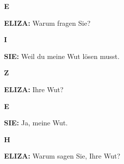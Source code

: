 \documentclass{article}
\begin{document}
\begin{minipage}[t]{0.13\textwidth}
  \centering
  {\bfseries\fontsize{14.4}{14.4}\selectfont\textcolor{pastelpink}{E}}
\end{minipage}%
\begin{minipage}[t]{0.81\textwidth}
  \textbf{ELIZA:} Warum fragen Sie?
\end{minipage}

\vspace{0.5cm}

\begin{minipage}[t]{0.13\textwidth}
  \centering
  {\bfseries\fontsize{14.4}{14.4}\selectfont\textcolor{pastelpink}{I}}
\end{minipage}%
\begin{minipage}[t]{0.81\textwidth}
  \textbf{SIE:} Weil du meine Wut lösen musst.
\end{minipage}

\vspace{0.5cm}

\begin{minipage}[t]{0.13\textwidth}
  \centering
  {\bfseries\fontsize{14.4}{14.4}\selectfont\textcolor{pastelpink}{Z}}
\end{minipage}%
\begin{minipage}[t]{0.81\textwidth}
  \textbf{ELIZA:} Ihre Wut?
\end{minipage}

\vspace{0.5cm}

\begin{minipage}[t]{0.13\textwidth}
  \centering
  {\bfseries\fontsize{14.4}{14.4}\selectfont\textcolor{pastelpink}{E}}
\end{minipage}%
\begin{minipage}[t]{0.81\textwidth}
  \textbf{SIE:} Ja, meine Wut.
\end{minipage}

\vspace{0.5cm}

\begin{minipage}[t]{0.13\textwidth}
  \centering
  {\bfseries\fontsize{14.4}{14.4}\selectfont\textcolor{pastelpink}{H}}
\end{minipage}%
\begin{minipage}[t]{0.81\textwidth}
  \textbf{ELIZA:} Warum sagen Sie, Ihre Wut?
\end{minipage}

\vspace{0.5cm}
\end{document}

